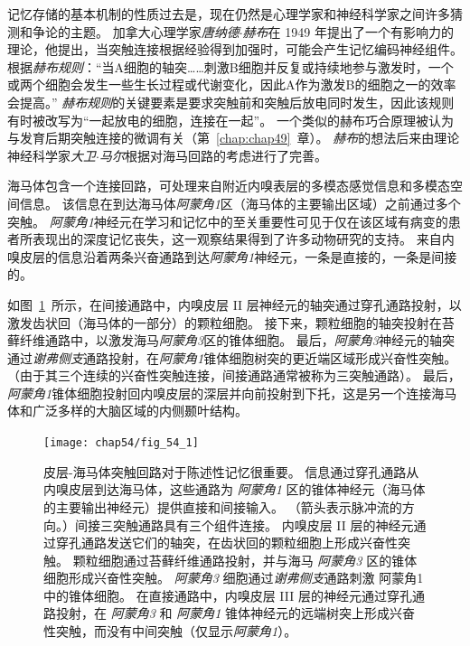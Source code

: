 记忆存储的基本机制的性质过去是，现在仍然是心理学家和神经科学家之间许多猜测和争论的主题。
加拿大心理学家\textit{唐纳德$\cdot$赫布}在 1949 年提出了一个有影响力的理论，他提出，当突触连接根据经验得到加强时，可能会产生记忆编码神经组件。
根据\textit{赫布规则}：“当A细胞的轴突……刺激B细胞并反复或持续地参与激发时，一个或两个细胞会发生一些生长过程或代谢变化，因此A作为激发B的细胞之一的效率会提高。”
\textit{赫布规则}的关键要素是要求突触前和突触后放电同时发生，因此该规则有时被改写为“一起放电的细胞，连接在一起”。
一个类似的赫布巧合原理被认为与发育后期突触连接的微调有关（第~\ref{chap:chap49}~章）。
\textit{赫布}的想法后来由理论神经科学家\textit{大卫$\cdot$马尔}根据对海马回路的考虑进行了完善。


海马体包含一个连接回路，可处理来自附近内嗅表层的多模态感觉信息和多模态空间信息。
该信息在到达海马体\textit{阿蒙角1}区（海马体的主要输出区域）之前通过多个突触。
\textit{阿蒙角1}神经元在学习和记忆中的至关重要性可见于仅在该区域有病变的患者所表现出的深度记忆丧失，这一观察结果得到了许多动物研究的支持。
来自内嗅皮层的信息沿着两条兴奋通路到达\textit{阿蒙角1}神经元，一条是直接的，一条是间接的。


如图~\ref{fig:54_1}~所示，在间接通路中，内嗅皮层 II 层神经元的轴突通过穿孔通路投射，以激发齿状回（海马体的一部分）的颗粒细胞。
接下来，颗粒细胞的轴突投射在苔藓纤维通路中，以激发海马\textit{阿蒙角3}区的锥体细胞。
最后，\textit{阿蒙角3}神经元的轴突通过\textit{谢弗侧支}通路投射，在\textit{阿蒙角1}锥体细胞树突的更近端区域形成兴奋性突触。
（由于其三个连续的兴奋性突触连接，间接通路通常被称为三突触通路）。
最后，\textit{阿蒙角1}锥体细胞投射回内嗅皮层的深层并向前投射到下托，这是另一个连接海马体和广泛多样的大脑区域的内侧颞叶结构。


\begin{figure}[htbp]
	\centering
	\texttt{[image: chap54/fig\_54\_1]}
	\caption{皮层-海马体突触回路对于陈述性记忆很重要。
		信息通过穿孔通路从内嗅皮层到达海马体，这些通路为 \textit{阿蒙角1} 区的锥体神经元（海马体的主要输出神经元）提供直接和间接输入。
		（箭头表示脉冲流的方向。）间接三突触通路具有三个组件连接。
		内嗅皮层 II 层的神经元通过穿孔通路发送它们的轴突，在齿状回的颗粒细胞上形成兴奋性突触。
		颗粒细胞通过苔藓纤维通路投射，并与海马 \textit{阿蒙角3} 区的锥体细胞形成兴奋性突触。
		\textit{阿蒙角3} 细胞通过\textit{谢弗侧支}通路刺激 阿蒙角1 中的锥体细胞。
		在直接通路中，内嗅皮层 III 层的神经元通过穿孔通路投射，在 \textit{阿蒙角3} 和 \textit{阿蒙角1} 锥体神经元的远端树突上形成兴奋性突触，而没有中间突触（仅显示\textit{阿蒙角1}）。}
	\label{fig:54_1}
\end{figure}



